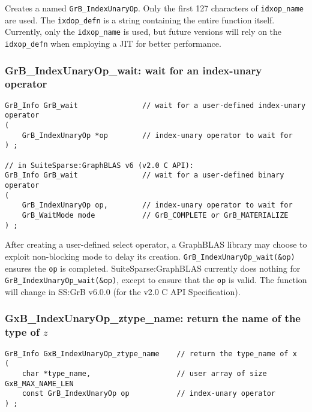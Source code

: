 \documentclass[12pt]{article}
\begin{document}
Creates a named \verb'GrB_IndexUnaryOp'.  Only the first 127 characters of
\verb'idxop_name' are used.  The \verb'ixdop_defn' is a string containing the
entire function itself.  Currently, only the \verb'idxop_name' is used, but
future versions will rely on the \verb'idxop_defn' when employing a JIT for
better performance.

\subsubsection{{\sf GrB\_IndexUnaryOp\_wait:} wait for an index-unary operator}
\label{idxunop_wait}

\begin{mdframed}[userdefinedwidth=6in]
{\footnotesize
\begin{verbatim}
GrB_Info GrB_wait               // wait for a user-defined index-unary operator
(
    GrB_IndexUnaryOp *op        // index-unary operator to wait for   
) ;

// in SuiteSparse:GraphBLAS v6 (v2.0 C API):
GrB_Info GrB_wait               // wait for a user-defined binary operator
(
    GrB_IndexUnaryOp op,        // index-unary operator to wait for   
    GrB_WaitMode mode           // GrB_COMPLETE or GrB_MATERIALIZE
) ;
\end{verbatim}
}\end{mdframed}

After creating a user-defined select operator, a GraphBLAS library may choose
to exploit non-blocking mode to delay its creation.
\verb'GrB_IndexUnaryOp_wait(&op)' ensures the \verb'op' is completed.
SuiteSparse:GraphBLAS currently does nothing for
\verb'GrB_IndexUnaryOp_wait(&op)', except to ensure that the \verb'op' is
valid.
The function will change in SS:GrB v6.0.0 (for the v2.0 C API Specification).

\subsubsection{{\sf GxB\_IndexUnaryOp\_ztype\_name:} return the name of the type of $z$}
\label{idxunop_ztype_name}

\begin{mdframed}[userdefinedwidth=6in]
{\footnotesize
\begin{verbatim}
GrB_Info GxB_IndexUnaryOp_ztype_name    // return the type_name of x
(
    char *type_name,                    // user array of size GxB_MAX_NAME_LEN
    const GrB_IndexUnaryOp op           // index-unary operator
) ;
\end{verbatim}
}\end{mdframed}
\end{document}

